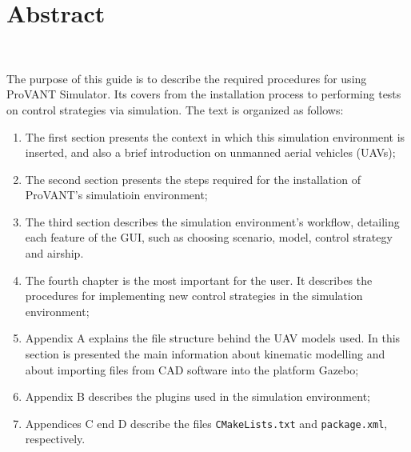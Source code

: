 \chapter*{Abstract}~

The purpose of this guide is to describe the required procedures for using ProVANT Simulator. Its covers from the installation process to performing tests on control strategies via simulation. The text is organized as follows:

\begin{enumerate}
	\item The first section presents the context in which this simulation environment is inserted, and also a brief introduction on unmanned aerial vehicles (UAVs);
	\item The second section presents the steps required for the installation of ProVANT's simulatioin environment;
	\item The third section describes the simulation environment's workflow, detailing each feature of the GUI, such as choosing scenario, model, control strategy and airship.
	\item The fourth chapter is the most important for the user. It describes the procedures for implementing new control strategies in the simulation environment;
	\item Appendix A explains the file structure behind the UAV models used. In this section is presented the main information about kinematic modelling and about importing files from CAD software into the platform Gazebo;
	\item Appendix B describes the plugins used in the simulation environment;
	\item Appendices C end D describe the files {\tt CMakeLists.txt} and {\tt package.xml}, respectively.
\end{enumerate}